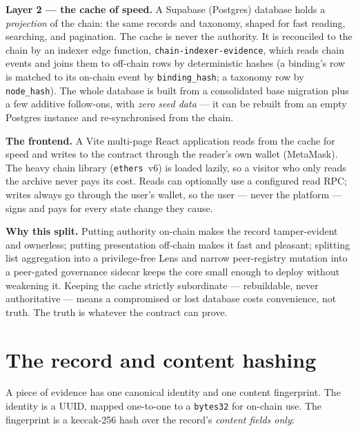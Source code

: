 \documentclass[11pt,a4paper]{article}
\begin{document}
\textbf{Layer 2 --- the cache of speed.} A Supabase (Postgres) database
holds a \emph{projection} of the chain: the same records and taxonomy,
shaped for fast reading, searching, and pagination. The cache is never the
authority. It is reconciled to the chain by an indexer edge function,
\texttt{chain-indexer-evidence}, which reads chain events and joins them to
off-chain rows by deterministic hashes (a binding's row is matched to its
on-chain event by \texttt{binding\_hash}; a taxonomy row by
\texttt{node\_hash}). The whole database is built from a consolidated base
migration plus a few additive follow-ons, with \emph{zero seed data} --- it can
be rebuilt from an empty Postgres instance and re-synchronised from the chain.

\textbf{The frontend.} A Vite multi-page React application reads from the
cache for speed and writes to the contract through the reader's own wallet
(MetaMask). The heavy chain library (\texttt{ethers}~v6) is loaded lazily,
so a visitor who only reads the archive never pays its cost. Reads can
optionally use a configured read RPC; writes always go through the user's
wallet, so the user --- never the platform --- signs and pays for every state
change they cause.

\begin{notebox}
\textbf{Why this split.} Putting authority on-chain makes the record
tamper-evident and ownerless; putting presentation off-chain makes it fast
and pleasant; splitting list aggregation into a privilege-free Lens and
narrow peer-registry mutation into a peer-gated governance sidecar keeps
the core small enough to deploy without weakening it. Keeping the cache
strictly subordinate --- rebuildable, never authoritative --- means a
compromised or lost database costs convenience, not truth. The truth is
whatever the contract can prove.
\end{notebox}

\section{The record and content hashing}

A piece of evidence has one canonical identity and one content fingerprint.
The identity is a UUID, mapped one-to-one to a \texttt{bytes32} for
on-chain use. The fingerprint is a keccak-256 hash over the record's
\emph{content fields only}:
\end{document}
